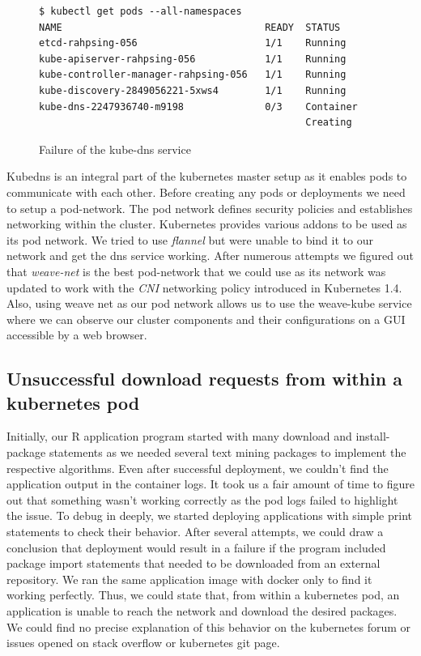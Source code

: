 \documentclass[9pt,twocolumn,twoside]{../../styles/osajnl}
\begin{document}
\begin{figure}[H]
\begin{verbatim}
$ kubectl get pods --all-namespaces
NAME                                   READY  STATUS       
etcd-rahpsing-056                      1/1    Running          
kube-apiserver-rahpsing-056            1/1    Running           
kube-controller-manager-rahpsing-056   1/1    Running           
kube-discovery-2849056221-5xws4        1/1    Running         
kube-dns-2247936740-m9198              0/3    Container
                                              Creating
\end{verbatim}
\vspace{-3mm}
\caption{Failure of the kube-dns service}
\vspace{-3mm}
\label{Instantiation failure of the kube-dns service}
\end{figure}
Kubedns is an integral part of the kubernetes master setup as it
enables pods to communicate with each other. Before creating any pods
or deployments we need to setup a pod-network. The pod network defines
security policies and establishes networking within the
cluster. Kubernetes provides various addons to be used as its pod
network. We tried to use \emph{flannel} but were unable to bind it to
our network and get the dns service working. After numerous attempts
we figured out that \emph{weave-net} is the best pod-network that we
could use as its network was updated to work with the \emph{CNI}
networking policy introduced in Kubernetes 1.4. Also, using weave net
as our pod network allows us to use the weave-kube service where we
can observe our cluster components and their configurations on a GUI
accessible by a web browser.

\subsection{Unsuccessful download requests from within a kubernetes pod}

Initially, our R application program started with many download and
install-package statements as we needed several text mining packages
to implement the respective algorithms. Even after successful
deployment, we couldn't find the application output in the container
logs. It took us a fair amount of time to figure out that something
wasn't working correctly as the pod logs failed to highlight the
issue. To debug in deeply, we started deploying applications with
simple print statements to check their behavior. After several
attempts, we could draw a conclusion that deployment would result in a
failure if the program included package import statements that needed
to be downloaded from an external repository. We ran the same
application image with docker only to find it working perfectly. Thus,
we could state that, from within a kubernetes pod, an application is
unable to reach the network and download the desired packages. We
could find no precise explanation of this behavior on the kubernetes
forum or issues opened on stack overflow or kubernetes git page.
\end{document}
